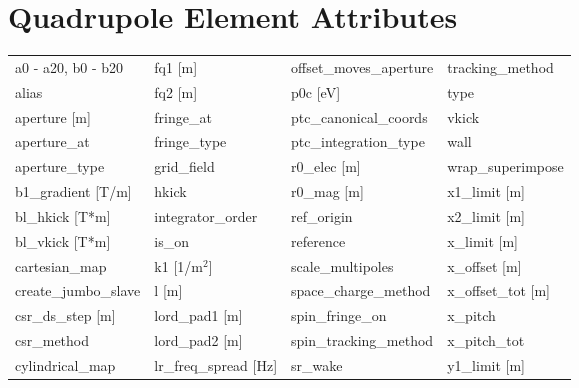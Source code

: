 \section{Quadrupole Element Attributes}
 \label{s:list.quadrupole}
 
 \begin{tabular}{llll} \toprule
a0 - a20, b0 - b20               & fq1 [m]                          & offset_moves_aperture            & tracking_method                  \\
alias                            & fq2 [m]                          & p0c [eV]                         & type                             \\
aperture [m]                     & fringe_at                        & ptc_canonical_coords             & vkick                            \\
aperture_at                      & fringe_type                      & ptc_integration_type             & wall                             \\
aperture_type                    & grid_field                       & r0_elec [m]                      & wrap_superimpose                 \\
b1_gradient [T/m]                & hkick                            & r0_mag [m]                       & x1_limit [m]                     \\
bl_hkick [T*m]                   & integrator_order                 & ref_origin                       & x2_limit [m]                     \\
bl_vkick [T*m]                   & is_on                            & reference                        & x_limit [m]                      \\
cartesian_map                    & k1 [1/m$^2$]                     & scale_multipoles                 & x_offset [m]                     \\
create_jumbo_slave               & l [m]                            & space_charge_method              & x_offset_tot [m]                 \\
csr_ds_step [m]                  & lord_pad1 [m]                    & spin_fringe_on                   & x_pitch                          \\
csr_method                       & lord_pad2 [m]                    & spin_tracking_method             & x_pitch_tot                      \\
cylindrical_map                  & lr_freq_spread [Hz]              & sr_wake                          & y1_limit [m]                     \\

\end{tabular}
